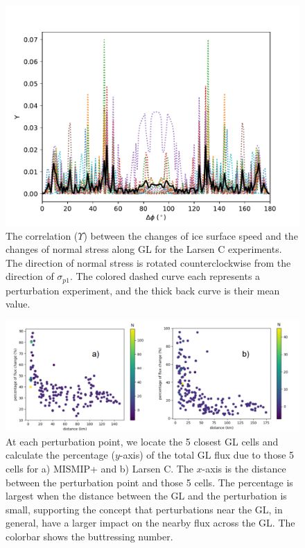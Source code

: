 \documentclass[review,oneside]{igs}
\begin{document}
\begin{appendices}
\begin{figure}
	\centering
	\includegraphics[width=1\linewidth]{figs/stress_vel_corr_GL_allP_larsenC.pdf}
	\caption{The correlation ($\Upsilon$) between the changes of ice surface speed and the changes of normal stress along GL for the Larsen C experiments. The direction of normal stress is rotated counterclockwise from the direction of $\sigma_{p1}$. The colored dashed curve each represents a perturbation experiment, and the thick back curve is their mean value.}
	\label{stress_vel_corr_GL_allP_larsenC}
\end{figure}

\begin{figure}
	\centering
	\includegraphics[width=1\linewidth]{figs/mismip_larsenc_dist.pdf}
	\caption{At each perturbation point, we locate the 5 closest GL cells and calculate the percentage ($y$-axis) of the total GL flux due to those 5 cells for a) MISMIP+ and b) Larsen C. The $x$-axis is the distance between the perturbation point and those 5 cells. The percentage is largest when the distance between the GL and the perturbation is small, supporting the concept that perturbations near the GL, in general, have a larger impact on the nearby flux across the GL. The colorbar shows the buttressing number.}
	\label{mismip_larsenc_dist}
\end{figure}


\end{appendices}
\end{document}

